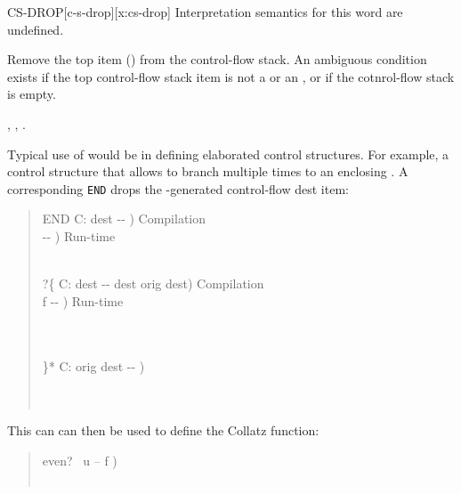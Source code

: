 \begin{worddef*}{}{CS-DROP}[c-s-drop][x:cs-drop]
\interpret
	Interpretation semantics for this word are undefined.

\execute

	Remove the top item () from the control-flow stack.
	An ambiguous condition exists if the top control-flow stack item is
	not a  or an , or if the cotnrol-flow stack is empty.

\see {}, , .

	\begin{rationale} %
		Typical use of  would be in defining elaborated control
		structures.  For example, a control structure that allows to branch multiple
		times to an enclosing .  A corresponding \texttt{END} drops
		the -generated control-flow dest item:

		\begin{quote}\ttfamily
			\word{:} END  C: dest -{}- )  Compilation \\
			\tab[3]  -{}- ) \tab[4.1]  Run-time \\
			\tab {} \\
			\word{;} 

			\word{:} ?\{  C: dest -{}- dest orig dest)  Compilation \\
			\tab[2.4]  f -{}- ) \tab[11.4]  Run-time \\
			\tab {}  \\
			  \\
			\word{;} 

			\word{:} \}*  C: orig dest -{}- ) \\
			\tab {}  \\
			\tab {}  \\
			\word{;} 
		\end{quote}

		This can can then be used to define the Collatz function:

		\begin{quote}\ttfamily
			\word{:} even?\  u -- f ) \\
			   \\
			\word{;}


\end{quote}
\end{rationale}
\end{worddef*}
